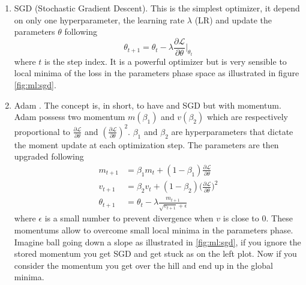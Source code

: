 \documentclass[../main.tex]{subfiles}
\begin{document}
\begin{enumerate}
  \item SGD (Stochastic Gradient Descent). This is the simplest optimizer, it depend on only one hyperparameter, the learning rate $\lambda$ (LR) and update the parameters $\theta$ following \begin{equation}
      \theta_{t+1} = \theta_t - \lambda \frac{\partial \mathcal{L}}{\partial \theta}\bigg|_{\theta_t}
    \end{equation}
    where $t$ is the step index. It is a powerful optimizer but is very sensible to local minima of the loss in the parameters phase space as illustrated in figure \ref{fig:ml:sgd}.

  \item Adam \cite{kingma_adam_2017}. The concept is, in short, to have and SGD but with momentum. Adam possess two momentum $m(\beta_1)$ and $v(\beta_2)$ which are respectively proportional to $\frac{\partial \mathcal{L}}{\partial \theta}$ and $(\frac{\partial \mathcal{L}}{\partial \theta})^2$. $\beta_1$ and $\beta_2$ are hyperparameters that dictate the moment update at each optimization step. The parameters are then upgraded following \begin{align}
      m_{t+1} &= \beta_1 m_t + (1 - \beta_1) \frac{\partial \mathcal{L}}{\partial \theta} \\
      v_{t+1} &= \beta_2 v_t + (1 - \beta_2) \bigg(\frac{\partial \mathcal{L}}{\partial \theta}\bigg)^2 \\
      \theta_{t+1} &= \theta_{t} - \lambda \frac{m_{t+1}}{\sqrt{v_{t+1}} + \epsilon}
    \end{align}
    where $\epsilon$ is a small number to prevent divergence when $v$ is close to 0. These momentums allow to overcome small local minima in the parameters phase. Imagine ball going down a slope as illustrated in \ref{fig:ml:sgd}, if you ignore the stored momentum you get SGD and get stuck as on the left plot. Now if you consider the momentum you get over the hill and end up in the global minima.
\end{enumerate}
\end{document}
